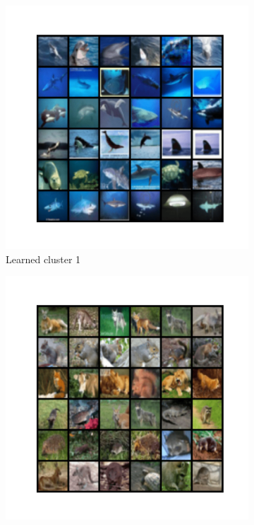 \documentclass[10pt,twocolumn,letterpaper]{article}
\begin{document}
   \begin{figure}
     \centering
     \begin{subfigure}{0.32\textwidth}
       \includegraphics[width=\linewidth,trim={1cm 2cm 1cm 2cm},clip]{figures/experiments/cifar100_cluster/nearest_class0.png}
       \caption{Learned cluster 1}
     \end{subfigure}
     \hfill
     \begin{subfigure}{0.32\textwidth}
       \includegraphics[width=\linewidth,trim={1cm 2cm 1cm 2cm},clip]{figures/experiments/cifar100_cluster/nearest_class1.png}

\end{subfigure}
\end{figure}
\end{document}
